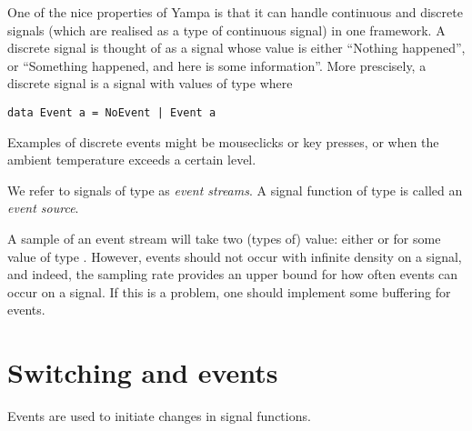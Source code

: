 One of the nice properties of Yampa is that it can handle continuous and discrete signals (which are realised as a type of continuous signal) in one framework. A discrete signal is thought of as a signal whose value is either ``Nothing happened'', or ``Something happened, and here is some information''. More prescisely, a discrete signal is a signal with values of type  where

\begin{lstlisting}
data Event a = NoEvent | Event a
\end{lstlisting}

Examples of discrete events might be mouseclicks or key presses, or when the ambient temperature exceeds a certain level.

We refer to signals of  type as \emph{event streams}. A signal function of type  is called an \emph{event source}.

A sample of an event stream will take two (types of) value: either  or  for some value of type . However, events should not occur with infinite density on a signal, and indeed, the sampling rate provides an upper bound for how often events can occur on a signal. If this is a problem, one should implement some buffering for events.

\section{Switching and events}

Events are used to initiate changes in signal functions.
